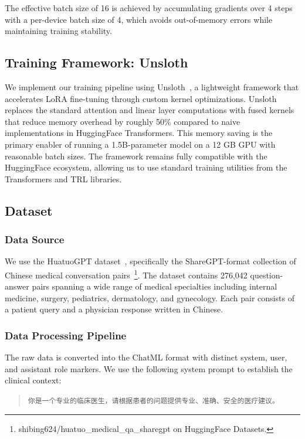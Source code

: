 \documentclass[11pt,a4paper]{article}
\begin{document}
The effective batch size of 16 is achieved by accumulating gradients over 4 steps with a per-device batch size of 4, which avoids out-of-memory errors while maintaining training stability.

\subsection{Training Framework: Unsloth}

We implement our training pipeline using Unsloth~\cite{unsloth2024}, a lightweight framework that accelerates LoRA fine-tuning through custom kernel optimizations. Unsloth replaces the standard attention and linear layer computations with fused kernels that reduce memory overhead by roughly 50\% compared to naive implementations in HuggingFace Transformers. This memory saving is the primary enabler of running a 1.5B-parameter model on a 12 GB GPU with reasonable batch sizes. The framework remains fully compatible with the HuggingFace ecosystem, allowing us to use standard training utilities from the Transformers and TRL libraries.

\subsection{Dataset}

\subsubsection{Data Source}

We use the HuatuoGPT dataset~\cite{zhang2023huatuogpt}, specifically the ShareGPT-format collection of Chinese medical conversation pairs~\footnote{shibing624/huatuo\_medical\_qa\_sharegpt on HuggingFace Datasets.}. The dataset contains 276,042 question-answer pairs spanning a wide range of medical specialties including internal medicine, surgery, pediatrics, dermatology, and gynecology. Each pair consists of a patient query and a physician response written in Chinese.

\subsubsection{Data Processing Pipeline}

The raw data is converted into the ChatML format with distinct system, user, and assistant role markers. We use the following system prompt to establish the clinical context:

\begin{quote}
\texttt{你是一个专业的临床医生，请根据患者的问题提供专业、准确、安全的医疗建议。}
\end{quote}
\end{document}
